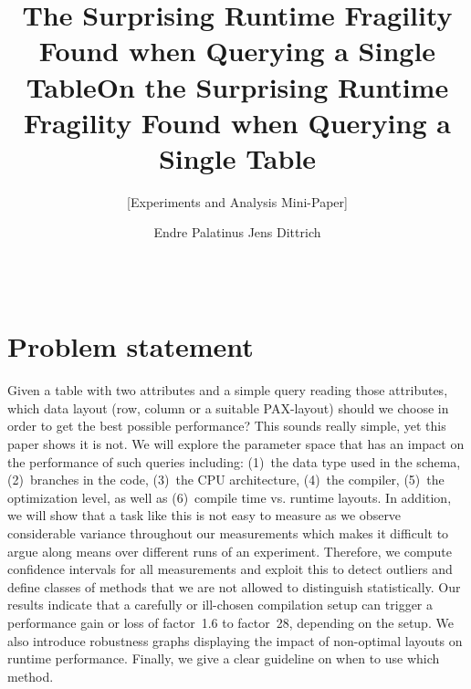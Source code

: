 \documentclass{sig-alternate}
\begin{document}
\title{The Surprising Runtime Fragility Found when Querying a Single Table}
\title{On the Surprising Runtime Fragility Found when Querying a Single Table}
\subtitle{\vspace*{-0.4cm}[Experiments and Analysis Mini-Paper]}


\author{
\alignauthor
Endre Palatinus \hspace{0.5cm} Jens Dittrich 
\\\vspace*{0.2cm}
\\
\\
}

\date{}

\maketitle

\section{Problem statement}

Given a table with two attributes and a simple query reading those attributes, which data layout (row, column or a suitable PAX-layout) should we choose in order to get the best possible performance? This sounds really simple, yet this paper shows it is not. We will explore the parameter space that has an impact on the performance of such queries including: (1)~the data type used in the schema, (2)~branches in the code, (3)~the CPU architecture, (4)~the compiler, (5)~the optimization level, as well as (6)~compile time vs. runtime layouts. In addition, we will show that a task like this is not easy to measure as we observe considerable variance throughout our measurements which makes it difficult to argue along means over different runs of an experiment. Therefore, we compute confidence intervals for all measurements and exploit this to detect outliers and define classes of methods that we are not allowed to distinguish statistically.
Our results indicate that a carefully or ill-chosen compilation setup can trigger a performance gain or loss of factor~1.6 to factor~28, depending on the setup. We also introduce robustness graphs displaying the impact of non-optimal layouts on runtime performance.
Finally, we give a clear guideline on when to use which method.
\end{document}
